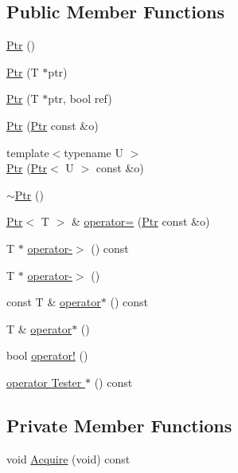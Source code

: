 \subsection*{Public Member Functions}
\begin{DoxyCompactItemize}
\item 
\hyperlink{classns3_1_1Ptr_a733d72d196e70ef62ffcb95f97ee42f6}{Ptr} ()
\item 
\hyperlink{classns3_1_1Ptr_a07865cd0a6aceaa840a30d4961e1bca7}{Ptr} (T $\ast$ptr)
\item 
\hyperlink{classns3_1_1Ptr_ad18339bad260c96e5c3c22dce380c418}{Ptr} (T $\ast$ptr, bool ref)
\item 
\hyperlink{classns3_1_1Ptr_aac090242e77b4586d632476ba744f965}{Ptr} (\hyperlink{classns3_1_1Ptr}{Ptr} const \&o)
\item 
{\footnotesize template$<$typename U $>$ }\\\hyperlink{classns3_1_1Ptr_af50beb87698e00e21288d64aac08de21}{Ptr} (\hyperlink{classns3_1_1Ptr}{Ptr}$<$ U $>$ const \&o)
\item 
\hyperlink{classns3_1_1Ptr_aed420da12cb2b0b79361f688e03ec341}{$\sim$\+Ptr} ()
\item 
\hyperlink{classns3_1_1Ptr}{Ptr}$<$ T $>$ \& \hyperlink{classns3_1_1Ptr_aed68ff16639e65606926671af2b3d28a}{operator=} (\hyperlink{classns3_1_1Ptr}{Ptr} const \&o)
\item 
T $\ast$ \hyperlink{classns3_1_1Ptr_ada2f1b3ebae8b0ee35d6b840f01ff1b2}{operator-\/$>$} () const 
\item 
T $\ast$ \hyperlink{classns3_1_1Ptr_a885ace1a3aee73436bc84387cd708944}{operator-\/$>$} ()
\item 
const T \& \hyperlink{classns3_1_1Ptr_a859ba385548d2f407b0fbb81517109c9}{operator$\ast$} () const 
\item 
T \& \hyperlink{classns3_1_1Ptr_a6a7537c21af519605a284b8417314505}{operator$\ast$} ()
\item 
bool \hyperlink{classns3_1_1Ptr_a893727e99295ba06f6d546f27416e24a}{operator!} ()
\item 
\hyperlink{classns3_1_1Ptr_a34606999f733fa070d246f5d178739a1}{operator Tester $\ast$} () const 
\end{DoxyCompactItemize}
\subsection*{Private Member Functions}
\begin{DoxyCompactItemize}
\item 
void \hyperlink{classns3_1_1Ptr_a9579b15e8c42dcdff5869d9d987562fb}{Acquire} (void) const 
\end{DoxyCompactItemize}
